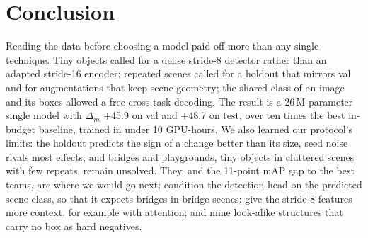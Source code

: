 \section{Conclusion}
\label{sec:conclusion}

Reading the data before choosing a model paid off more than any single technique.
Tiny objects called for a dense stride-8 detector rather than an adapted stride-16 encoder; repeated scenes called for a
holdout that mirrors val and for augmentations that keep scene geometry; the shared class of an image and its boxes
allowed a free cross-task decoding.
The result is a 26\,M-parameter single model with $\Delta_m$ +45.9 on val and +48.7 on test, over ten times the best
in-budget baseline, trained in under 10 GPU-hours.
We also learned our protocol's limits: the holdout predicts the sign of a change better than its size, seed noise
rivals most effects, and bridges and playgrounds, tiny objects in cluttered scenes with few repeats, remain unsolved.
They, and the 11-point mAP gap to the best teams, are where we would go next: condition the detection head on the
predicted scene class, so that it expects bridges in bridge scenes; give the stride-8 features more context, for
example with attention; and mine look-alike structures that carry no box as hard negatives.
